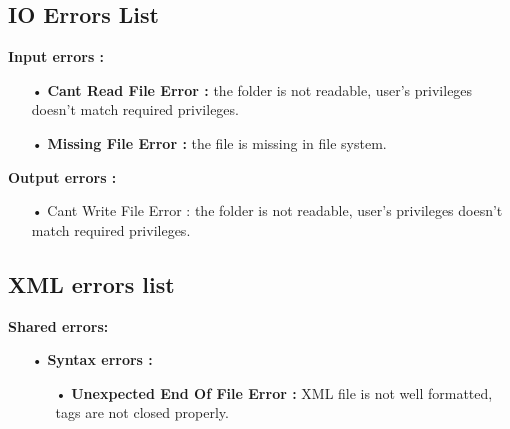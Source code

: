 \documentclass[paper=a4, fontsize=11pt]{report}
\numberwithin{equation}{section}		%
\numberwithin{figure}{section}		%
\numberwithin{table}{section}		%
\begin{document}
\subsection{IO Errors List}
\label{subsec:io-errors-list}

\textbf{Input errors :}
\begin{itemize}
  \item[•] \textbf{Cant Read File Error :} the folder is not readable, user’s privileges doesn’t match required privileges.
  \item[•] \textbf{Missing File Error :} the file is missing in file system. 
\end{itemize}

\textbf{Output errors :}
\begin{itemize}
  \item[•] Cant Write File Error : the folder is not readable, user’s privileges doesn’t match required privileges.  
\end{itemize}

\subsection{XML errors list}
\label{subsec:xml-errors-lists}

\textbf{Shared errors:}
\begin{itemize}
  \item[•] \textbf{Syntax errors :}
  \begin{itemize}
    \item[•] \textbf{Unexpected End Of File Error :} XML file is not well formatted, tags are not closed properly.
  \end{itemize}
\end{itemize}
\end{document}
